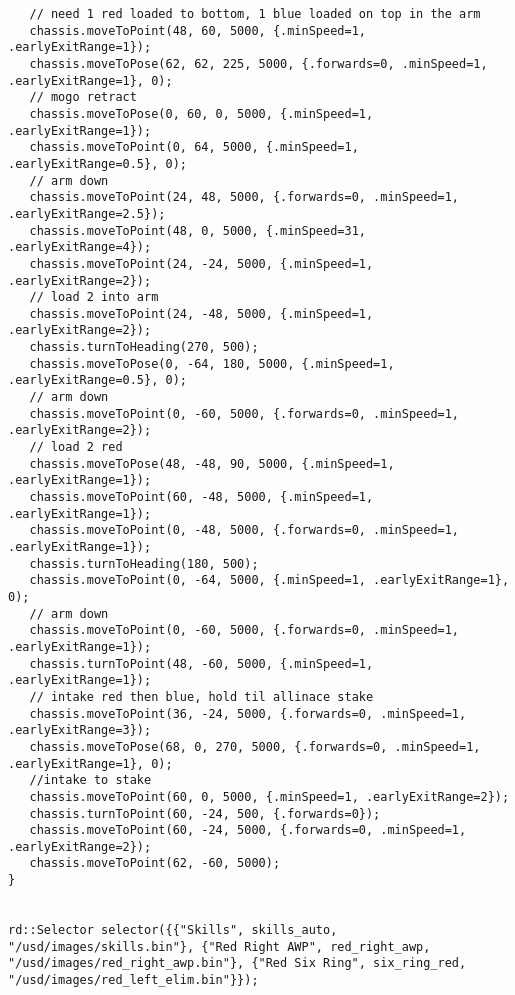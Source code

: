 \begin{verbatim}
   // need 1 red loaded to bottom, 1 blue loaded on top in the arm
   chassis.moveToPoint(48, 60, 5000, {.minSpeed=1, .earlyExitRange=1});
   chassis.moveToPose(62, 62, 225, 5000, {.forwards=0, .minSpeed=1, .earlyExitRange=1}, 0);
   // mogo retract
   chassis.moveToPose(0, 60, 0, 5000, {.minSpeed=1, .earlyExitRange=1});
   chassis.moveToPoint(0, 64, 5000, {.minSpeed=1, .earlyExitRange=0.5}, 0);
   // arm down
   chassis.moveToPoint(24, 48, 5000, {.forwards=0, .minSpeed=1, .earlyExitRange=2.5});
   chassis.moveToPoint(48, 0, 5000, {.minSpeed=31, .earlyExitRange=4});
   chassis.moveToPoint(24, -24, 5000, {.minSpeed=1, .earlyExitRange=2});
   // load 2 into arm
   chassis.moveToPoint(24, -48, 5000, {.minSpeed=1, .earlyExitRange=2});
   chassis.turnToHeading(270, 500);
   chassis.moveToPose(0, -64, 180, 5000, {.minSpeed=1, .earlyExitRange=0.5}, 0);
   // arm down
   chassis.moveToPoint(0, -60, 5000, {.forwards=0, .minSpeed=1, .earlyExitRange=2});
   // load 2 red
   chassis.moveToPose(48, -48, 90, 5000, {.minSpeed=1, .earlyExitRange=1});
   chassis.moveToPoint(60, -48, 5000, {.minSpeed=1, .earlyExitRange=1});
   chassis.moveToPoint(0, -48, 5000, {.forwards=0, .minSpeed=1, .earlyExitRange=1});
   chassis.turnToHeading(180, 500);
   chassis.moveToPoint(0, -64, 5000, {.minSpeed=1, .earlyExitRange=1}, 0);
   // arm down
   chassis.moveToPoint(0, -60, 5000, {.forwards=0, .minSpeed=1, .earlyExitRange=1});
   chassis.turnToPoint(48, -60, 5000, {.minSpeed=1, .earlyExitRange=1});
   // intake red then blue, hold til allinace stake
   chassis.moveToPoint(36, -24, 5000, {.forwards=0, .minSpeed=1, .earlyExitRange=3});
   chassis.moveToPose(68, 0, 270, 5000, {.forwards=0, .minSpeed=1, .earlyExitRange=1}, 0);
   //intake to stake
   chassis.moveToPoint(60, 0, 5000, {.minSpeed=1, .earlyExitRange=2});
   chassis.turnToPoint(60, -24, 500, {.forwards=0});
   chassis.moveToPoint(60, -24, 5000, {.forwards=0, .minSpeed=1, .earlyExitRange=2});
   chassis.moveToPoint(62, -60, 5000);
}


rd::Selector selector({{"Skills", skills_auto, "/usd/images/skills.bin"}, {"Red Right AWP", red_right_awp, "/usd/images/red_right_awp.bin"}, {"Red Six Ring", six_ring_red, "/usd/images/red_left_elim.bin"}});


\end{verbatim}
